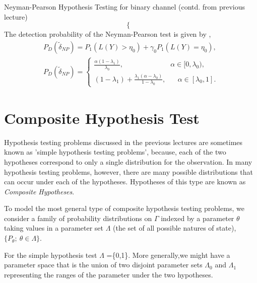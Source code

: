 \documentclass[a4paper,english,12pt]{article}
\begin{document}
\begin{exmp}{Neyman-Pearson Hypothesis Testing for binary channel (contd. from previous lecture)}
\begin{equation}
\begin{cases}
\end{cases}
\end{equation}
The detection probability of the Neyman-Pearson test is given by ,
\begin{eqnarray}
{P}_D (\tilde{\delta}_{NP}) ={P}_1(L(Y) > \eta_0) + \gamma_0 {P}_1(L(Y) = \eta_0),\\\nonumber
{P}_D (\tilde{\delta}_{NP}) =\begin{cases}
\frac{\alpha (1-\lambda_1)}{\lambda_0},\hspace{80pt}\alpha \in [0,\lambda_0),\\
(1-\lambda_1) + \frac{\lambda_1 (\alpha -\lambda_0)}{1-\lambda_0},\hspace{20pt}\alpha \in [\lambda_0,1].
\end{cases}
\end{eqnarray}
\end{exmp}
\section{Composite Hypothesis Test}
Hypothesis testing problems discussed in the previous lectures are sometimes known as 'simple hypothesis testing problems', because, each of the two hypotheses correspond to only a single distribution for the observation. In many hypothesis testing problems, however, there are many possible distributions that can occur under each of the hypotheses. Hypotheses of this type are known as \textit{Composite Hypotheses}.
\par To model the most general type of composite hypothesis testing problems, we consider a family of probability distributions on $\Gamma$ indexed by a parameter $\theta$ taking values in a parameter set $\Lambda$ (the set of all possible natures of state), $\{P_\theta;~\theta \in \Lambda\}$.
\begin{exmp}
For the simple hypothesis test $\Lambda$ =\{0,1\}. More generally,we might have a parameter space that is the union of two disjoint parameter sets $\Lambda_0$ and $\Lambda_1$ representing the ranges of the parameter under the two hypotheses. 
\end{exmp}
\end{document}
